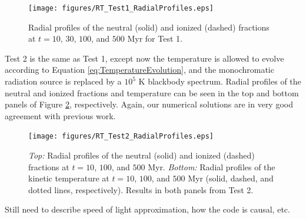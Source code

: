\documentclass[preprint2]{aastex}              %
\begin{document}
\begin{figure}[htbp]
\centering
\texttt{[image: figures/RT\_Test1\_RadialProfiles.eps]} 
\caption[]{Radial profiles of the neutral (solid) and ionized (dashed) fractions at $t = 10$, $30$, $100$, and $500$ Myr for Test 1.}
\label{fig:RT_Test1_RadialProfiles}
\end{figure}

Test 2 is the same as Test 1, except now the temperature is allowed to evolve according to Equation \ref{eq:TemperatureEvolution}, and the monochromatic radiation source is replaced by a $10^5$ K blackbody spectrum.  Radial profiles of the neutral and ionized fractions and temperature can be seen in the top and bottom panels of Figure \ref{fig:RT_Test2_RadialProfiles}, respectively.  Again, our numerical solutions are in very good agreement with previous work.

\begin{figure}[htbp]
\centering
\texttt{[image: figures/RT\_Test2\_RadialProfiles.eps]}
\caption{\textit{Top:} Radial profiles of the neutral (solid) and ionized (dashed) fractions at $t = 10$, $100$, and $500$ Myr. \textit{Bottom:} Radial profiles of the kinetic temperature at $t = 10$, $100$, and $500$ Myr (solid, dashed, and dotted lines, respectively).  Results in both panels from Test 2.}
\label{fig:RT_Test2_RadialProfiles}
\end{figure}

Still need to describe speed of light approximation, how the code is causal, etc.
\end{document}

